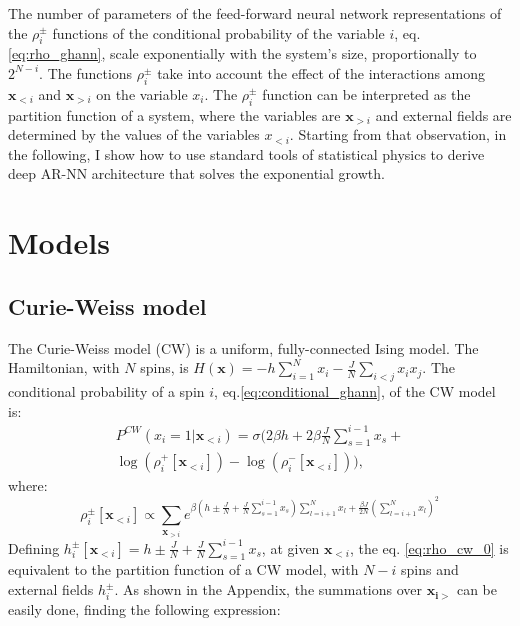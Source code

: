 \documentclass[aps,physrev,10pt,floatfix,reprint]{revtex4-2}
\begin{document}
The number of parameters of the feed-forward neural network representations of the $\rho_i^{\pm}$ functions of the conditional probability of the variable $i$, eq.\ref{eq:rho_ghann}, scale exponentially with the system's size, proportionally to $2^{N-i}$. 
The functions $\rho_i^{\pm}$ take into account the effect of the interactions among $\mathbf{x}_{<i}$ and $\mathbf{x}_{>i}$ on the variable $x_i$. 
The $\rho_i^{\pm}$ function can be interpreted as the partition function of a system, where the variables are $\mathbf{x}_{>i}$ and external fields are determined by the values of the variables $x_{<i}$.
Starting from that observation, in the following, I show how to use standard tools of statistical physics to derive deep AR-NN architecture that solves the exponential growth.  \\

\section{Models}
\subsection{Curie-Weiss model}

The Curie-Weiss model (CW) is a uniform, fully-connected Ising model. The Hamiltonian, with $N$ spins, is $H\left(\mathbf{x}\right)=-h\sum_{i=1}^{N}x_{i}-\frac{J}{N}\sum_{i<j}x_{i}x_{j}$. The conditional probability of a spin $i$, eq.\ref{eq:conditional_ghann}, of the CW model is:
\begin{multline}
P^{CW}\left(x_{i}=1|\mathbf{x}_{<i}\right) = 
\sigma\bigg( 
 2 \beta h + 2 \beta \frac{J}{N}\sum_{s=1}^{i-1}x_{s} + \\
 \log(\rho_i^+[\mathbf{x}_{<i}]) - \log(\rho_i^-[\mathbf{x}_{<i}])
\bigg),
\label{eq:conditional_cw}
\end{multline}
where:
\begin{equation}
\rho_i^{\pm}[\mathbf{x}_{<i}] \propto \sum_{\mathbf{x}_{>i}}e^{\beta \left(h\pm\frac{J}{N}+\frac{J}{N}\sum_{s=1}^{i-1}x_{s}\right)\sum_{l=i+1}^{N}x_{l}+\frac{\beta J}{2N}(\sum_{l=i+1}^{N}x_{l})^{2}} 
\label{eq:rho_cw_0}
\end{equation}
Defining $h_i^{\pm}[\mathbf{x}_{<i}] =h\pm\frac{J}{N}+\frac{J}{N}\sum_{s=1}^{i-1}x_{s}$, at given $\mathbf{x}_{<i}$, the eq. \ref{eq:rho_cw_0} is equivalent to the partition function of a CW model, with $N-i$ spins and external fields $h_i^{\pm}$. 
As shown in the Appendix, the summations over $\mathbf{x_{i>}}$ can be easily done, finding the following expression:
\end{document}
